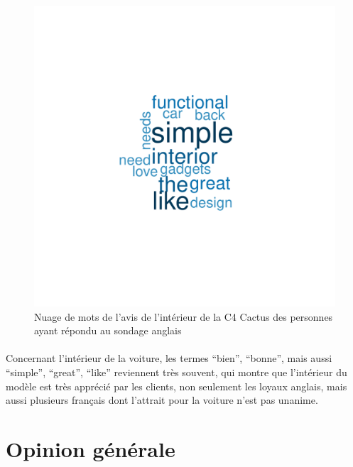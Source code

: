 \documentclass[12pt]{article}\usepackage[]{graphicx}\usepackage[]{color}
\makeatletter
\def\maxwidth{ %
  \ifdim\Gin@nat@width>\linewidth
    \linewidth
  \else
    \Gin@nat@width
  \fi
}
\newenvironment{knitrout}{}{} %
\makeatother
\begin{document}
\begin{knitrout}
\color{fgcolor}\begin{figure}[H]
\includegraphics[width=\maxwidth]{figure/interior_en-1} \caption[Nuage de mots de l'avis de l'intérieur de la C4 Cactus des personnes ayant répondu au sondage anglais]{Nuage de mots de l'avis de l'intérieur de la C4 Cactus des personnes ayant répondu au sondage anglais}\label{fig:interior en}
\end{figure}


\end{knitrout}

\paragraph{} Concernant l'intérieur de la voiture, les termes ``bien'',
``bonne'', mais aussi ``simple'', ``great'', ``like'' reviennent très souvent,
qui montre que l'intérieur du modèle est très apprécié par les clients, non
seulement les loyaux anglais, mais aussi plusieurs français dont l'attrait pour
la voiture n'est pas unanime.

\break
\section{Opinion générale}
\end{document}
